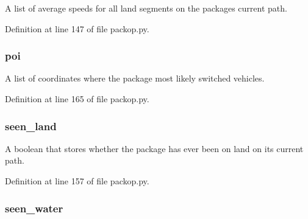 A list of average speeds for all land segments on the package\textquotesingle{}s current path. 



Definition at line 147 of file packop.\+py.

\subsubsection[{\texorpdfstring{poi}{poi}}]{\setlength{\rightskip}{0pt plus 5cm}poi}\hypertarget{classsrc_1_1packop_1_1_package_aeed2d9226ad1fadceb4f10cdeb20992f}{}\label{classsrc_1_1packop_1_1_package_aeed2d9226ad1fadceb4f10cdeb20992f}


A list of coordinates where the package most likely switched vehicles. 



Definition at line 165 of file packop.\+py.

\subsubsection[{\texorpdfstring{seen\+\_\+land}{seen_land}}]{\setlength{\rightskip}{0pt plus 5cm}seen\+\_\+land}\hypertarget{classsrc_1_1packop_1_1_package_a9b051e33800c5a152ad902f886757d26}{}\label{classsrc_1_1packop_1_1_package_a9b051e33800c5a152ad902f886757d26}


A boolean that stores whether the package has ever been on land on its current path. 



Definition at line 157 of file packop.\+py.

\subsubsection[{\texorpdfstring{seen\+\_\+water}{seen_water}}]{\setlength{\rightskip}{0pt plus 5cm}seen\+\_\+water}\hypertarget{classsrc_1_1packop_1_1_package_a47ad90cdc00f18fca0d9499e89a6baab}{}\label{classsrc_1_1packop_1_1_package_a47ad90cdc00f18fca0d9499e89a6baab}


